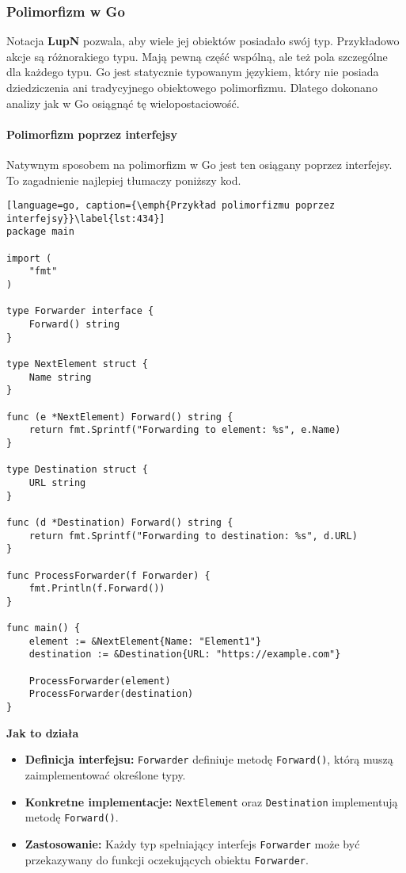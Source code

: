 \subsubsection{Polimorfizm w Go}

Notacja \textbf{LupN} pozwala, aby wiele jej obiektów posiadało swój typ. Przykładowo akcje są różnorakiego typu. Mają pewną część wspólną, ale też pola szczególne dla każdego typu. Go jest statycznie typowanym językiem, który nie posiada dziedziczenia ani tradycyjnego obiektowego polimorfizmu. Dlatego dokonano analizy jak w Go osiągnąć tę wielopostaciowość.

\paragraph{Polimorfizm poprzez interfejsy}

Natywnym sposobem na polimorfizm w Go jest ten osiągany poprzez interfejsy. To zagadnienie najlepiej tłumaczy poniższy kod.


\begin{lstlisting}[language=go, caption={\emph{Przykład polimorfizmu poprzez interfejsy}}\label{lst:434}]
package main

import (
	"fmt"
)

type Forwarder interface {
	Forward() string
}

type NextElement struct {
	Name string
}

func (e *NextElement) Forward() string {
	return fmt.Sprintf("Forwarding to element: %s", e.Name)
}

type Destination struct {
	URL string
}

func (d *Destination) Forward() string {
	return fmt.Sprintf("Forwarding to destination: %s", d.URL)
}

func ProcessForwarder(f Forwarder) {
	fmt.Println(f.Forward())
}

func main() {
	element := &NextElement{Name: "Element1"}
	destination := &Destination{URL: "https://example.com"}

	ProcessForwarder(element)
	ProcessForwarder(destination)
}
\end{lstlisting}

\textbf{Jak to działa}

\begin{itemize}
    \item \textbf{Definicja interfejsu:}  
    \texttt{Forwarder} definiuje metodę \texttt{Forward()}, którą muszą zaimplementować określone typy.
    
    \item \textbf{Konkretne implementacje:}  
    \texttt{NextElement} oraz \texttt{Destination} implementują metodę \texttt{Forward()}.
    
    \item \textbf{Zastosowanie:}  
    Każdy typ spełniający interfejs \texttt{Forwarder} może być przekazywany do funkcji oczekujących obiektu \texttt{Forwarder}.
\end{itemize}

